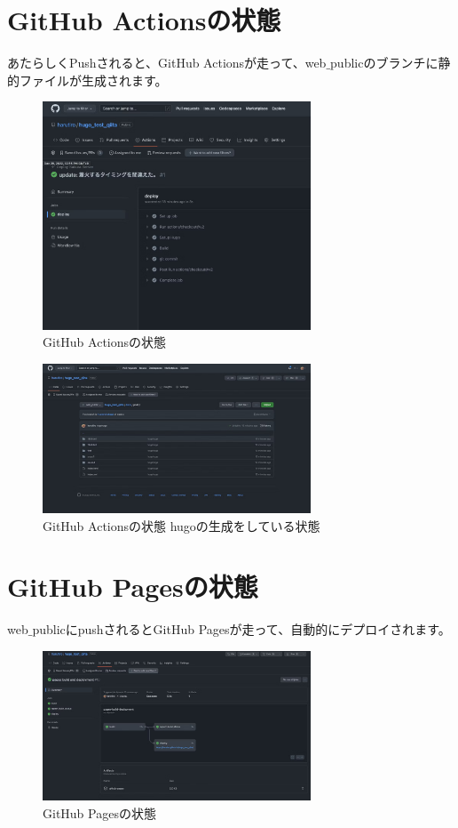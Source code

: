 \section{GitHub Actionsの状態}
  あたらしくPushされると、GitHub Actionsが走って、web$\_$publicのブランチに静的ファイルが生成されます。

  \begin{figure}[H]
    \centering
    \includegraphics[width=8cm]{./image/02-chap9/git-action1.png}
    \caption{GitHub Actionsの状態}
    \label{chap9-git-action1-image}
  \end{figure}

  \begin{figure}[H]
    \centering
    \includegraphics[width=8cm]{./image/02-chap9/git-action2.png}
    \caption{GitHub Actionsの状態 hugoの生成をしている状態}
    \label{chap9-git-action2-image}
  \end{figure}

\section{GitHub Pagesの状態}
  web$\_$publicにpushされるとGitHub Pagesが走って、自動的にデプロイされます。

  \begin{figure}[H]
    \centering
    \includegraphics[width=8cm]{./image/02-chap9/git-pases.png}
    \caption{GitHub Pagesの状態}
    \label{chap9-git-pases-image}
  \end{figure}

